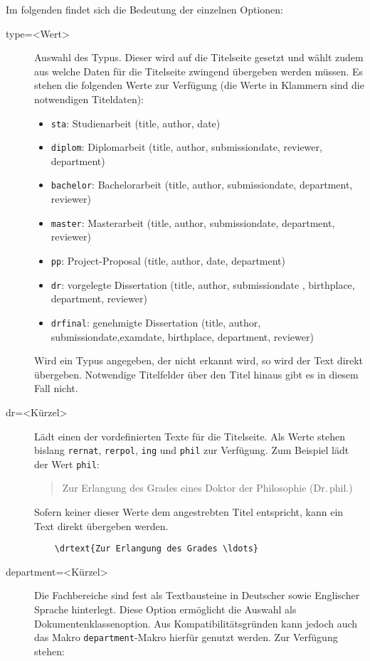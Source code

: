 \documentclass[
	german,%
	accentcolor=9c,%
	ruledheaders=section,%
	class=report,%
	thesis={type=bachelor},%
	fontsize=11pt,%
	parskip=half-,%
	custommargins=true,%
	marginpar=false,%
]{tudapub}
\newcommand*{\code}[1]{\texttt{#1}}
\begin{document}
Im folgenden findet sich die Bedeutung der einzelnen Optionen:
\begin{description}
	\item[type=<Wert>] Auswahl des Typus. Dieser wird auf die Titelseite gesetzt und wählt zudem aus welche Daten für die Titelseite zwingend übergeben werden müssen.
	      Es stehen die folgenden Werte zur Verfügung (die Werte in Klammern sind die notwendigen Titeldaten):
	      \begin{itemize}
		      \item \code{sta}: Studienarbeit (title, author, date)
		      \item \code{diplom}: Diplomarbeit (title, author, submissiondate, reviewer, department)
		      \item \code{bachelor}: Bachelorarbeit (title, author, submissiondate, department, reviewer)
		      \item \code{master}: Masterarbeit (title, author, submissiondate, department, reviewer)
		      \item \code{pp}: Project-Proposal  (title, author, date, department)
		      \item \code{dr}: vorgelegte Dissertation (title, author, submissiondate , birthplace, department, reviewer)
		      \item \code{drfinal}: genehmigte Dissertation (title, author, submissiondate,examdate, birthplace, department, reviewer)
	      \end{itemize}
	      Wird ein Typus angegeben, der nicht erkannt wird, so wird der Text direkt übergeben. Notwendige Titelfelder über den Titel hinaus gibt es in diesem Fall nicht.
	\item[dr=<Kürzel>] Lädt einen der vordefinierten Texte für die Titelseite. Als Werte stehen bislang \code{rernat}, \code{rerpol}, \code{ing} und \code{phil} zur Verfügung. Zum Beispiel lädt der Wert \code{phil}:
	      \begin{quote}
		      Zur Erlangung des Grades eines Doktor der Philosophie (Dr.\,phil.)
	      \end{quote}
	      Sofern keiner dieser Werte dem angestrebten Titel entspricht, kann ein Text direkt übergeben werden.
\begin{verbatim}
    \drtext{Zur Erlangung des Grades \ldots}
\end{verbatim}
	\item[department=<Kürzel>] Die Fachbereiche sind fest als Textbausteine in Deutscher sowie Englischer Sprache hinterlegt. Diese Option ermöglicht die Auswahl als Dokumentenklassenoption. Aus Kompatibilitätsgründen kann jedoch auch das Makro \code{department}-Makro hierfür genutzt werden. Zur Verfügung stehen:\par

\end{description}
\end{document}
